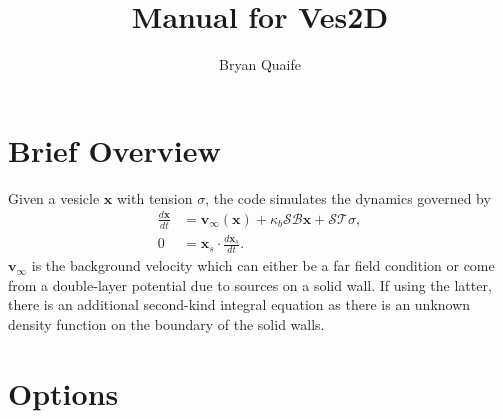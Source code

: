 \documentclass[12pt]{article}
\title{Manual for Ves2D}
\author{Bryan Quaife}
\newcommand{\xx}{{\mathbf{x}}}
\newcommand{\vv}{{\mathbf{v}}}
\renewcommand{\SS}{{\mathcal{S}}}
\newcommand{\BB}{{\mathcal{B}}}
\newcommand{\TT}{{\mathcal{T}}}
\begin{document}
\maketitle

\section{Brief Overview}
Given a vesicle $\xx$ with tension $\sigma$, the code simulates the
dynamics governed by
\begin{align*}
  \frac{d\xx}{dt} &= \vv_{\infty}(\xx)+\kappa_{b}\SS\BB\xx+\SS\TT\sigma, \\
  0 &= \xx_{s} \cdot \frac{d\xx_{s}}{dt}.
\end{align*}
$\vv_{\infty}$ is the background velocity which can either be a far
field condition or come from a double-layer potential due to sources on
a solid wall.  If using the latter, there is an additional second-kind
integral equation as there is an unknown density function on the
boundary of the solid walls.

\section{Options}
\end{document}
